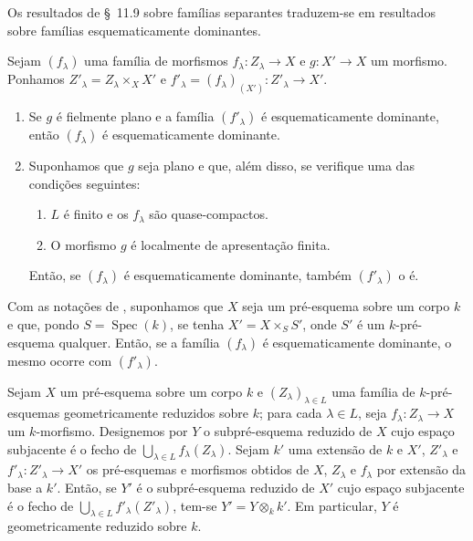 Os resultados de
\S~11.9 sobre
famílias separantes
traduzem-se em
resultados sobre
famílias
esquematicamente
dominantes.

\begin{theorem}[11.10.5]
\label{IV.11.10.5}
Sejam
$(f_\lambda)$
uma família de
morfismos
$f_\lambda:
Z_\lambda\to X$
e $g:X'\to X$
um morfismo.
Ponhamos
$Z'_\lambda=
Z_\lambda\times_X X'$
e
$f'_\lambda=
(f_\lambda)_{(X')}:
Z'_\lambda\to X'$.
\begin{enumerate}[label=(\roman*)]
\item Se $g$ é
fielmente plano
e a família
$(f'_\lambda)$ é
esquematicamente
dominante, então
$(f_\lambda)$ é
esquematicamente
dominante.
\item Suponhamos
que $g$ seja
plano e que,
além disso,
se verifique
uma das condições
seguintes:
\begin{enumerate}[label=\emph{\alph*)}]
\item $L$ é finito
e os $f_\lambda$
são quase-compactos.
\item O morfismo
$g$ é localmente
de apresentação
finita.
\end{enumerate}
Então, se
$(f_\lambda)$ é
esquematicamente
dominante, também
$(f'_\lambda)$ o é.
\end{enumerate}
\end{theorem}


\begin{proposition}[11.10.6]
\label{IV.11.10.6}
Com as notações de
,
suponhamos que $X$
seja um pré-esquema
sobre um corpo $k$
e que, pondo
$S=\operatorname{Spec}(k)$,
se tenha
$X'=X\times_S S'$,
onde $S'$ é um
$k$-pré-esquema
qualquer. Então,
se a família
$(f_\lambda)$ é
esquematicamente
dominante, o mesmo
ocorre com
$(f'_\lambda)$.
\end{proposition}

\begin{corollary}[11.10.7]
\label{IV.11.10.7}
Sejam $X$ um
pré-esquema sobre
um corpo $k$ e
$(Z_\lambda)_{\lambda
\in L}$ uma família
de $k$-pré-esquemas
geometricamente
reduzidos sobre $k$;
para cada
$\lambda\in L$,
seja
$f_\lambda:
Z_\lambda\to X$
um $k$-morfismo.
Designemos por $Y$
o subpré-esquema
reduzido de $X$
cujo espaço
subjacente é o fecho
de
$\bigcup_{\lambda
\in L}f_\lambda
(Z_\lambda)$.
Sejam $k'$ uma
extensão de $k$ e
$X'$, $Z'_\lambda$
e
$f'_\lambda:
Z'_\lambda\to X'$
os pré-esquemas e
morfismos obtidos
de $X$,
$Z_\lambda$ e
$f_\lambda$ por
extensão da base
a $k'$. Então,
se $Y'$ é o
subpré-esquema
reduzido de $X'$
cujo espaço
subjacente é o fecho
de
$\bigcup_{\lambda
\in L}f'_\lambda
(Z'_\lambda)$,
tem-se
$Y'=Y\otimes_k k'$.
Em particular,
$Y$ é
geometricamente
reduzido sobre $k$.
\end{corollary}


